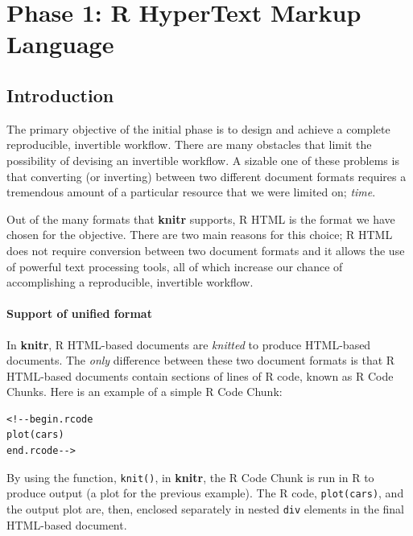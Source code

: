 \documentclass[a4paper, 12pt]{report}
\begin{document}
\chapter{Phase 1: R HyperText Markup Language}
\begin{figure}[h]
\centering
\end{figure}

\section{Introduction}
\label{sec:3.1}
The primary objective of the initial phase is to design and achieve a complete reproducible, invertible workflow. There are many obstacles that limit the possibility of devising an invertible workflow. A sizable one of these problems is that converting (or inverting) between two different document formats requires a tremendous amount of a particular resource that we were limited on; \emph{time}.

Out of the many formats that \textbf{knitr} supports, R HTML is the format we have chosen for the objective. There are two main reasons for this choice; R HTML does not require conversion between two document formats and it allows the use of powerful text processing tools, all of which increase our chance of accomplishing a reproducible, invertible workflow.

\subsubsection*{Support of unified format}
In \textbf{knitr}, R HTML-based documents are \emph{knitted} to produce HTML-based documents. The \emph{only} difference between these two document formats is that R HTML-based documents contain sections of lines of R code, known as R Code Chunks. Here is an example of a simple R Code Chunk:
\begin{lstlisting}[numbers=none, frame=none]
<!--begin.rcode
plot(cars)
end.rcode-->
\end{lstlisting}
By using the function, \texttt{knit()}, in \textbf{knitr}, the R Code Chunk is run in R to produce output (a plot for the previous example). The R code, \texttt{plot(cars)}, and the output plot are, then, enclosed separately in nested \texttt{div} elements in the final HTML-based document.
\end{document}
